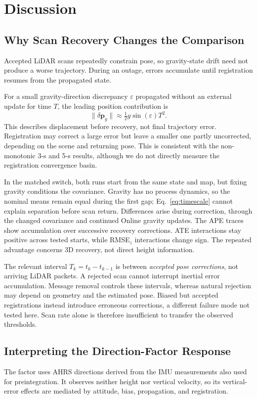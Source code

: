 \section{Discussion}
\label{sec:analysis}

\subsection{Why Scan Recovery Changes the Comparison}
Accepted LiDAR scans repeatedly constrain pose, so gravity-state drift need
not produce a worse trajectory. During an outage, errors accumulate until
registration resumes from the propagated state.

For a small gravity-direction discrepancy $\varepsilon$ propagated without an
external update for time $T$, the leading position contribution is
\begin{equation}
 \|\delta\mathbf p_g\|\approx\tfrac12g\sin(\varepsilon)T^2 .
 \label{eq:timescale}
\end{equation}
This describes displacement before recovery, not final trajectory error.
Registration may correct a large error but leave a smaller one partly
uncorrected, depending on the scene and returning pose. This is consistent
with the non-monotonic 3-s and 5-s results, although we do not directly measure
the registration convergence basin.

In the matched switch, both runs start from the same state and map, but fixing
gravity conditions the covariance. Gravity has no process dynamics, so the
nominal means remain equal during the first gap; Eq.~\ref{eq:timescale} cannot
explain separation before scan return. Differences arise during correction,
through the changed covariance and continued Online gravity updates. The APE
traces show accumulation over successive recovery corrections. ATE
interactions stay positive across tested starts, while RMSE$_z$ interactions
change sign. The repeated advantage concerns 3D recovery, not direct height
information.

The relevant interval $T_k=t_k-t_{k-1}$ is between \emph{accepted pose
corrections}, not arriving LiDAR packets. A rejected scan cannot interrupt
inertial error accumulation. Message removal controls these intervals, whereas
natural rejection may depend on geometry and the estimated pose. Biased but
accepted registrations instead introduce erroneous corrections, a different
failure mode not tested here. Scan rate alone is therefore insufficient to
transfer the observed thresholds.

\subsection{Interpreting the Direction-Factor Response}
The factor uses AHRS directions derived from the IMU measurements also used
for preintegration. It observes neither height nor vertical velocity, so its
vertical-error effects are mediated by attitude, bias, propagation, and
registration.

